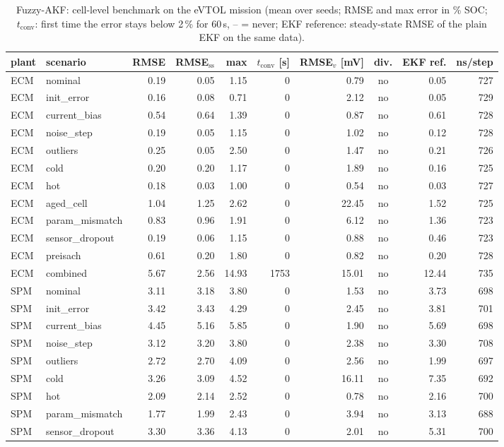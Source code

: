 \begin{table}[H]\centering\footnotesize\setlength{\tabcolsep}{4pt}
\caption{Fuzzy-AKF: cell-level benchmark on the eVTOL mission (mean over seeds; RMSE and max error in \% SOC; $t_\mathrm{conv}$: first time the error stays below 2\,\% for 60\,s, -- = never; EKF reference: steady-state RMSE of the plain EKF on the same data).}\label{tab:cell_FuzzyAKF}
\begin{tabular}{llrrrrrcrr}\toprule
plant & scenario & RMSE & RMSE$_\mathrm{ss}$ & max & $t_\mathrm{conv}$ [s] & RMSE$_v$ [mV] & div. & EKF ref. & ns/step \\ \midrule
ECM & nominal & 0.19 & 0.05 & 1.15 & 0 & 0.79 & no & 0.05 & 727 \\
ECM & init\_error & 0.16 & 0.08 & 0.71 & 0 & 2.12 & no & 0.05 & 729 \\
ECM & current\_bias & 0.54 & 0.64 & 1.39 & 0 & 0.87 & no & 0.61 & 728 \\
ECM & noise\_step & 0.19 & 0.05 & 1.15 & 0 & 1.02 & no & 0.12 & 728 \\
ECM & outliers & 0.25 & 0.05 & 2.50 & 0 & 1.47 & no & 0.21 & 726 \\
ECM & cold & 0.20 & 0.20 & 1.17 & 0 & 1.89 & no & 0.16 & 725 \\
ECM & hot & 0.18 & 0.03 & 1.00 & 0 & 0.54 & no & 0.03 & 727 \\
ECM & aged\_cell & 1.04 & 1.25 & 2.62 & 0 & 22.45 & no & 1.52 & 725 \\
ECM & param\_mismatch & 0.83 & 0.96 & 1.91 & 0 & 6.12 & no & 1.36 & 723 \\
ECM & sensor\_dropout & 0.19 & 0.06 & 1.15 & 0 & 0.88 & no & 0.46 & 723 \\
ECM & preisach & 0.61 & 0.20 & 1.80 & 0 & 0.82 & no & 0.20 & 728 \\
ECM & combined & 5.67 & 2.56 & 14.93 & 1753 & 15.01 & no & 12.44 & 735 \\
\midrule
SPM & nominal & 3.11 & 3.18 & 3.80 & 0 & 1.53 & no & 3.73 & 698 \\
SPM & init\_error & 3.42 & 3.43 & 4.29 & 0 & 2.45 & no & 3.81 & 701 \\
SPM & current\_bias & 4.45 & 5.16 & 5.85 & 0 & 1.90 & no & 5.69 & 698 \\
SPM & noise\_step & 3.12 & 3.20 & 3.80 & 0 & 2.38 & no & 3.30 & 708 \\
SPM & outliers & 2.72 & 2.70 & 4.09 & 0 & 2.56 & no & 1.99 & 697 \\
SPM & cold & 3.26 & 3.09 & 4.52 & 0 & 16.11 & no & 7.35 & 692 \\
SPM & hot & 2.09 & 2.14 & 2.52 & 0 & 0.78 & no & 2.16 & 700 \\
SPM & param\_mismatch & 1.77 & 1.99 & 2.43 & 0 & 3.94 & no & 3.13 & 688 \\
SPM & sensor\_dropout & 3.30 & 3.36 & 4.13 & 0 & 2.01 & no & 5.31 & 700 \\
\bottomrule\end{tabular}\end{table}

